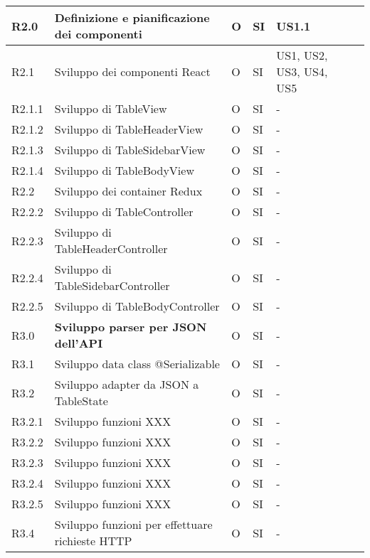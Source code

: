 \begin{longtable} {
		|>{}p{10mm}| 
		|>{}p{60mm}|
		|>{}p{15mm}|
		|>{}p{15mm}|
		|>{}p{15mm}|
		>{}p{0mm}}
	\hline
	R2.0   & \textbf{Definizione e pianificazione dei componenti} & O & SI & US1.1\\ \hline
	R2.1   & Sviluppo dei componenti React 		  & O & SI & US1, US2, US3, US4, US5 \\ \hline
	R2.1.1 & Sviluppo di TableView                & O & SI & -     \\ \hline
	R2.1.2 & Sviluppo di TableHeaderView          & O & SI & -     \\ \hline
	R2.1.3 & Sviluppo di TableSidebarView         & O & SI & -     \\ \hline
	R2.1.4 & Sviluppo di TableBodyView            & O & SI & -     \\ \hline
	R2.2   & Sviluppo dei container Redux         & O & SI & -     \\ \hline
	R2.2.2 & Sviluppo di TableController          & O & SI & -     \\ \hline
	R2.2.3 & Sviluppo di TableHeaderController    & O & SI & -     \\ \hline
	R2.2.4 & Sviluppo di TableSidebarController   & O & SI & -     \\ \hline
	R2.2.5 & Sviluppo di TableBodyController      & O & SI & -     \\ \hline
	\hline
	R3.0   & \textbf{Sviluppo parser per JSON dell'API}         & O & SI & -     \\ \hline
	R3.1   & Sviluppo data class @Serializable 	   & O & SI & -     \\ \hline
	R3.2   & Sviluppo adapter da JSON a TableState & O & SI & -     \\ \hline
	R3.2.1   & Sviluppo funzioni XXX & O & SI & -     \\ \hline
	R3.2.2   & Sviluppo funzioni XXX & O & SI & -     \\ \hline
	R3.2.3   & Sviluppo funzioni XXX & O & SI & -     \\ \hline
	R3.2.4   & Sviluppo funzioni XXX & O & SI & -     \\ \hline
	R3.2.5   & Sviluppo funzioni XXX & O & SI & -     \\ \hline
	R3.4 & Sviluppo funzioni per effettuare richieste HTTP  & O & SI & -     \\ \hline
	\hline
\end{longtable}